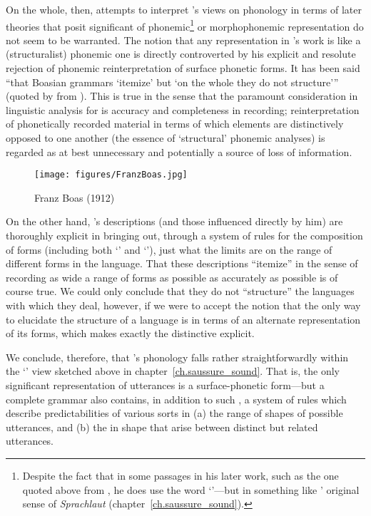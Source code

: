 On the whole, then, attempts to interpret {\Boas}'s views on phonology in
terms of later theories that posit significant  of
phonemic\footnote{Despite the fact that in some passages in his later
  work, such as the one quoted above from \citealt{boas47:kwakiutl},
  he does use the word `'---but in something like
  {\DufricheDesgenettes}' original sense of \emph{Sprachlaut}
  (chapter~\ref{ch.saussure_sound}).} or morphophonemic representation
do not seem to be warranted. The notion that any representation in
{\Boas}'s work is like a (structuralist) phonemic one is directly
controverted by his explicit and resolute rejection of phonemic
reinterpretation of surface phonetic forms. It has been said ``that
Boasian grammars `itemize' but `on the whole they do not structure'''
(quoted by \citealt[478]{stocking74:boas} from
\citealt{hymes61:rvw.goldschmidt}). This is true in the sense that the
paramount consideration in linguistic analysis for {\Boas} is accuracy
and completeness in recording; reinterpretation of phonetically
recorded material in terms of which elements are distinctively opposed
to one another (the essence of `structural' phonemic analyses) is
regarded as at best unnecessary and potentially a source of loss of
information.

\begin{wrapfigure}{r}{.4\textwidth}
  \texttt{[image: figures/FranzBoas.jpg]}
  \caption{Franz Boas (1912)}
  \label{fig:ch.boas.boas}
\end{wrapfigure}
On the other hand, {\Boas}'s descriptions (and those influenced directly
by him) are thoroughly explicit in bringing out, through a system of
rules for the composition of forms (including both `' and
`'), just what the limits are on the range of different
forms in the language. That these descriptions ``itemize'' in the sense
of recording as wide a range of forms as possible as accurately as
possible is of course true. We could only conclude that they do not
``structure'' the languages with which they deal, however, if we were to
accept the notion that the only way to elucidate the structure of a
language is in terms of an alternate representation of its forms,
which makes exactly the distinctive  explicit.

We conclude, therefore, that {\Boas}'s phonology falls rather
straightforwardly within the `' view
sketched above in chapter~\ref{ch.saussure_sound}. That is, the only
significant representation of utterances is a surface-phonetic
form—but a complete grammar also contains, in addition to such
, a system of rules which describe predictabilities of
various sorts in (a) the range of shapes of possible utterances, and
(b) the  in shape that arise between distinct but
related utterances.

